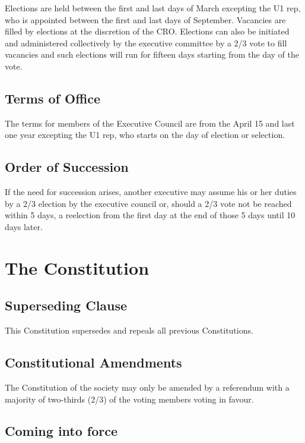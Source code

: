 Elections are held between the first and last days of March excepting
the U1 rep, who is appointed between the first and last days of
September. Vacancies are filled by elections at the discretion of the
CRO. Elections can also be initiated and administered collectively by
the executive committee by a 2/3 vote to fill vacancies and such
elections will run for fifteen days starting from the day of the vote.

\subsection{Terms of Office}\label{terms-of-office}

The terms for members of the Executive Council are from the April 15 and
last one year excepting the U1 rep, who starts on the day of election or
selection.

\subsection{Order of Succession}\label{order-of-succession}

If the need for succession arises, another executive may assume his or
her duties by a 2/3 election by the executive council or, should a 2/3
vote not be reached within 5 days, a reelection from the first day at
the end of those 5 days until 10 days later.

\section{The Constitution}\label{the-constitution}

\subsection{Superseding Clause}\label{superseding-clause}

This Constitution supersedes and repeals all previous Constitutions.

\subsection{Constitutional Amendments}\label{constitutional-amendments}

The Constitution of the society may only be amended by a referendum with
a majority of two-thirds (2/3) of the voting members voting in favour.

\subsection{Coming into force}\label{coming-into-force}

